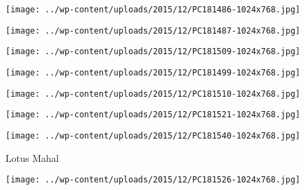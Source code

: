  

 

\begin{center} \texttt{[image: ../wp-content/uploads/2015/12/PC181486-1024x768.jpg]} \end{center}

 

 

\begin{center} \texttt{[image: ../wp-content/uploads/2015/12/PC181487-1024x768.jpg]} \end{center}

 

 

\begin{center} \texttt{[image: ../wp-content/uploads/2015/12/PC181509-1024x768.jpg]} \end{center}

 

 

\begin{center} \texttt{[image: ../wp-content/uploads/2015/12/PC181499-1024x768.jpg]} \end{center}

 

 

\begin{center} \texttt{[image: ../wp-content/uploads/2015/12/PC181510-1024x768.jpg]} \end{center}

 

 

\begin{center} \texttt{[image: ../wp-content/uploads/2015/12/PC181521-1024x768.jpg]} \end{center}

 

 

\begin{center} \texttt{[image: ../wp-content/uploads/2015/12/PC181540-1024x768.jpg]} \end{center}

 

 Lotus Mahal 

 

\begin{center} \texttt{[image: ../wp-content/uploads/2015/12/PC181526-1024x768.jpg]} \end{center}

